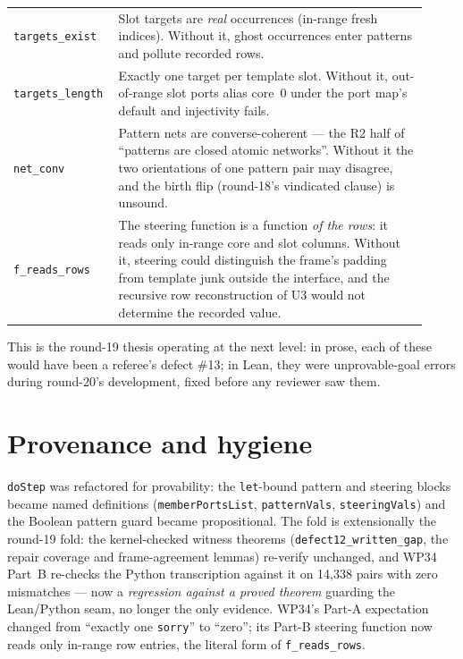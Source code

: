 \documentclass[11pt]{article}
\newcommand{\code}[1]{\texttt{#1}}
\begin{document}
\begin{center}
\begin{tabular}{p{0.2\linewidth}p{0.72\linewidth}}
\toprule
\code{targets\_exist} & Slot targets are \emph{real} occurrences
(in-range fresh indices).  Without it, ghost occurrences enter
patterns and pollute recorded rows.\\
\code{targets\_length} & Exactly one target per template slot.
Without it, out-of-range slot ports alias core~0 under the port map's
default and injectivity fails.\\
\code{net\_conv} & Pattern nets are converse-coherent --- the R2 half
of ``patterns are closed atomic networks''.  Without it the two
orientations of one pattern pair may disagree, and the birth flip
(round-18's vindicated clause) is unsound.\\
\code{f\_reads\_rows} & The steering function is a function \emph{of
the rows}: it reads only in-range core and slot columns.  Without it,
steering could distinguish the frame's padding from template junk
outside the interface, and the recursive row reconstruction of U3
would not determine the recorded value.\\
\bottomrule
\end{tabular}
\end{center}

This is the round-19 thesis operating at the next level: in prose,
each of these would have been a referee's defect \#13; in Lean, they
were unprovable-goal errors during round-20's development, fixed
before any reviewer saw them.

\section{Provenance and hygiene}

\code{doStep} was refactored for provability: the \code{let}-bound
pattern and steering blocks became named definitions
(\code{memberPortsList}, \code{patternVals}, \code{steeringVals}) and
the Boolean pattern guard became propositional.  The fold is
extensionally the round-19 fold: the kernel-checked witness theorems
(\code{defect12\_written\_gap}, the repair coverage and
frame-agreement lemmas) re-verify unchanged, and WP34 Part~B
re-checks the Python transcription against it on 14{,}338 pairs with
zero mismatches --- now a \emph{regression against a proved theorem}
guarding the Lean/Python seam, no longer the only evidence.  WP34's
Part-A expectation changed from ``exactly one \code{sorry}'' to
``zero''; its Part-B steering function now reads only in-range row
entries, the literal form of \code{f\_reads\_rows}.
\end{document}
